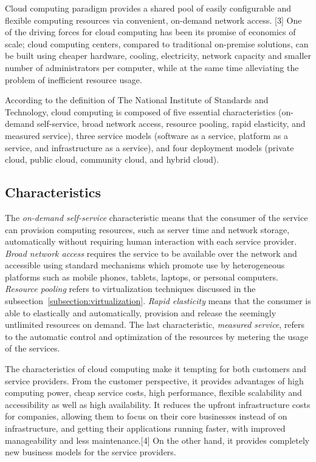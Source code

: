 Cloud computing paradigm provides a shared pool of easily configurable and flexible computing resources via convenient, on-demand network access. [3] One of the driving forces for cloud computing has been its promise of economics of scale; cloud computing centers, compared to traditional on-premise solutions, can be built using cheaper hardware, cooling, electricity, network capacity and smaller number of administrators per computer, while at the same time alleviating the problem of inefficient resource usage.~\cite{Mell:2011:ccdef}

According to the definition of The National Institute of Standards and Technology, cloud computing is composed of five essential characteristics (on-demand self-service, broad network access, resource pooling, rapid elasticity, and measured service), three service models (software as a service, platform as a service, and infrastructure as a service), and four deployment models (private cloud, public cloud, community cloud, and hybrid cloud).~\cite{Mell:2011:ccdef}

\subsection{Characteristics}
The \emph{on-demand self-service} characteristic means that the consumer of the service can provision computing resources, such as server time and network storage, automatically without requiring human interaction with each service provider. \emph{Broad network access} requires the service to be available over the network and accessible using standard mechanisms which promote use by heterogeneous platforms such as mobile phones, tablets, laptops, or personal computers. \emph{Resource pooling} refers to virtualization techniques discussed in the subsection~\ref{subsection:virtualization}. \emph{Rapid elasticity} means that the consumer is able to elastically and automatically, provision and release the seemingly untlimited resources on demand. The last characteristic, \emph{measured service}, refers to the automatic control and optimization of the resources by metering the usage of the services.~\cite{Mell:2011:ccdef}

The characteristics of cloud computing make it tempting for both customers and service providers. From the customer perspective, it provides advantages of high computing power, cheap service costs, high performance, flexible scalability and accessibility as well as high availability. It reduces the upfront infrastructure costs for companies, allowing them to focus on their core businesses instead of on infrastructure, and getting their applications running faster, with improved manageability and less maintenance.[4] On the other hand, it provides completely new business models for the service providers.

